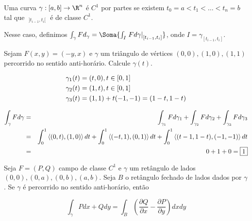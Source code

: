 \documentclass[11pt, oneside, a4paper]{gsm-l}
\begin{document}
\begin{defi}
\begin{sloppypar}
Uma curva $\gamma: [a,b] \to \R^n$ é $C^1$ por partes se existem ${t_0 = a < t_1 < \ldots < t_n = b}$ tal que $\mathop {\left. \gamma  \right|}\nolimits_{]t_{i - 1} ,t_i [}$ é de classe $C^1$.
\end{sloppypar}


Nesse caso, definimos $\int_\gamma F d_\gamma = \Soma{\int_I {\mathop {\left. {Fd\gamma } \right|}\nolimits_{[t_{i - 1} ,t_i ]} }}$, onde $I = \gamma_{[t_{i - 1} ,t_i ]}$.
\end{defi}

\begin{exem}
Sejam $F(x,y) = (-y,x)$ e $\gamma$ um tri\^angulo de vértices $(0,0),(1,0),(1,1)$ percorrido no sentido anti-horário. Calcule $\gamma(t)$.

\end{exem}

\begin{sol}
\[
\begin{gathered}
  \gamma _1 (t) = (t,0),t \in [0,1] \hfill \\
  \gamma _2 (t) = (1,t),t \in [0,1] \hfill \\
  \gamma _3 (t) = (1,1) + t( - 1, - 1) = (1 - t,1 - t) \hfill \\ 
\end{gathered} 
\]

\begin{eqnarray*}
  \int_\gamma  {Fd\gamma }  &=& \int_{\gamma _1 } {Fd\gamma _1 }  + \int_{\gamma _2 } {Fd\gamma _2 }  + \int_{\gamma _3 } {Fd\gamma _3 }  \hfill \\
   &=& \int_0^1 {\left\langle {(0,t),(1,0)} \right\rangle dt}  + \int_0^1 {\left\langle {( - t,1),(0,1)} \right\rangle dt}  + \int_0^1 {\left\langle {(t - 1,1 - t),( - 1, - 1)} \right\rangle dt}  \hfill \\
   &=& 0 + 1 + 0 = \boxed1 \hfill \\ 
\end{eqnarray*}

\end{sol}

\newpage 

\begin{prop}
Seja $F = (P,Q)$ campo de classe $C^1$ e $\gamma$ um ret\^angulo de lados $(0,0),(0,a),(0,b),(a,b)$. Seja $B$ o ret\^angulo fechado de lados dados por $\gamma$. Se $\gamma$ é percorrido no sentido anti-horário, então

\[
\int_\gamma  {Pdx + Qdy}  = \int_B {\left( {\frac{{\partial Q}}
{{\partial x}} - \frac{{\partial P}}
{{\partial y}}} \right)dxdy} 
\]

\end{prop}
\end{document}
